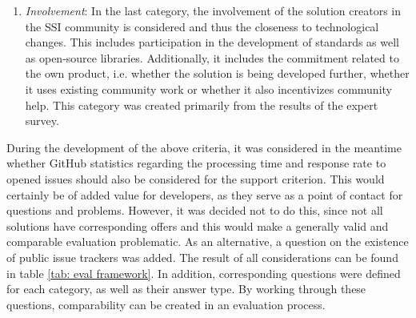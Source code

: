 \begin{enumerate}
        \item \textit{Involvement}: In the last category, the involvement of the solution creators in the \ac{SSI} community is considered and thus the closeness to technological changes. This includes participation in the development of standards as well as open-source libraries. Additionally, it includes the commitment related to the own product, i.e. whether the solution is being developed further, whether it uses existing community work or whether it also incentivizes community help. This category was created primarily from the results of the expert survey.
    \end{enumerate}
    
    During the development of the above criteria, it was considered in the meantime whether GitHub statistics regarding the processing time and response rate to opened issues should also be considered for the support criterion. This would certainly be of added value for developers, as they serve as a point of contact for questions and problems. However, it was decided not to do this, since not all solutions have corresponding offers and this would make a generally valid and comparable evaluation problematic. As an alternative, a question on the existence of public issue trackers was added. The result of all considerations can be found in table \ref{tab: eval framework}. In addition, corresponding questions were defined for each category, as well as their answer type. By working through these questions, comparability can be created in an evaluation process.
    
